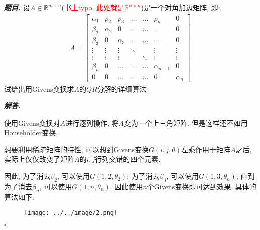 \documentclass[10pt, a4paper, oneside]{ctexart}
\newenvironment{problem}{\begin{framed}\par\noindent\textbf{\textit{题目. }}}{\end{framed}\par}
\newenvironment{solution}{%
  \par\noindent\textbf{\textit{解答. }}\ignorespaces
}{%
  \hfill\ensuremath{\square}\par %
}
\begin{document}
    \begin{problem}
        设$A\in \mathbb{R}^{m\times n}$(\textcolor{red}{书上typo, 此处就是$\mathbb{R}^{n\times n}$})是一个对角加边矩阵, 即:
        \begin{align*}
            A = \begin{bmatrix}
                \alpha_1 & \rho_2 & \rho_3 & \dots & \dots & \rho_n & 0 \\
                \beta_2 & \alpha_2 & 0 & \dots & \dots & \dots & 0 \\
                \beta_3 & 0 & \alpha_3 & \dots & \dots & \dots & 0 \\
                \vdots & \vdots & \vdots & \ddots & & \vdots & \vdots \\
                \vdots & \vdots & \vdots & & \ddots & \vdots & \vdots \\
                \beta_n & 0 & \dots & \dots & \dots & \alpha_{n-1} & 0 \\
                0 & 0 & \dots & \dots & \dots & 0 & \alpha_n
                \end{bmatrix}
        \end{align*}
        试给出用Givens变换求$A$的$QR$分解的详细算法
    \end{problem}
    \begin{solution}
    使用Givens变换对$A$进行逐列操作, 将$A$变为一个上三角矩阵. 但是这样还不如用Householder变换.
    
    想要利用稀疏矩阵的特性, 可以想到Givens变换$G(i,j,\theta)$左乘作用于矩阵$A$之后, 实际上仅仅改变了矩阵$A$的$i,j$行列交错的四个元素.
    
    因此, 为了消去$\beta_2$, 可以使用$G(1,2,\theta_2)$; 为了消去$\beta_3$, 可以使用$G(1,3,\theta_n)$; 直到为了消去$\beta_n$, 可以使用$G(1,n,\theta_n)$. 因此使用$n$个Givens变换即可达到效果, 具体的算法如下:
    \begin{figure}[h]
        \centering
        \texttt{[image: ../../image/2.png]}
    \end{figure}
    \end{solution}
\end{document}
